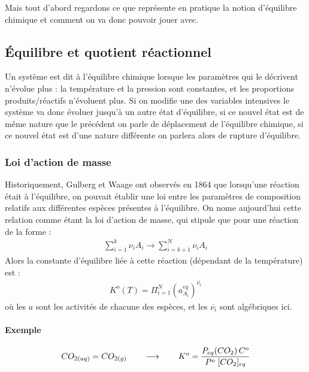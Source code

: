 \documentclass[12pt,prb,aps,epsf]{report}
\begin{document}
Mais tout d'abord regardons ce que représente en pratique la notion d'équilibre chimique et comment on va donc pouvoir jouer avec.

\subsection{Équilibre et quotient réactionnel}
Un système est dit à l'équilibre chimique lorsque les paramètres qui le décrivent n'évolue plus : la température et la pression sont constantes, et les proportions produits/réactifs n'évoluent plus. Si on modifie une des variables intensives le système va donc évoluer jusqu'à un autre état d'équilibre, si ce nouvel état est de même nature que le précédent on parle de déplacement de l'équilibre chimique, si ce nouvel état est d'une nature différente on parlera alors de rupture d'équilibre.
\subsubsection{Loi d'action de masse}
Historiquement, Gulberg et Waage ont observés en 1864 que lorsqu'une réaction était à l'équilibre, on pouvait établir une loi entre les paramètres de composition relatifs aux différentes espèces présentes à l'équilibre. On nome aujourd'hui cette relation comme étant la loi d'action de masse, qui stipule que pour une réaction de la forme :
\begin{eqnarray}
\sum_{i=1}^k {\nu_i}A_i \longrightarrow \sum_{i=k+1}^N {\nu_i}A_i \label{réac}
\end{eqnarray}
Alors la constante d'équilibre liée à cette réaction (dépendant de la température) est :
\begin{eqnarray}
K^{o}(T) = \Pi_{i=1}^N (a_{A_i}^{eq})^{\overline{\nu_i}}
\end{eqnarray}
où les $a$ sont les activités de chacune des espèces, et les $\overline{\nu_i}$ sont algébriques ici.
\paragraph{Exemple} 
\begin{eqnarray}
CO_{2(aq)} = CO_{2(g)}\hspace{0.7cm} \longrightarrow \hspace{0.7cm} K^{o} = \frac{P_{eq}(CO_2)\,C^o}{P^{o}\;[CO_2]_{eq}}
\end{eqnarray}
\end{document}
